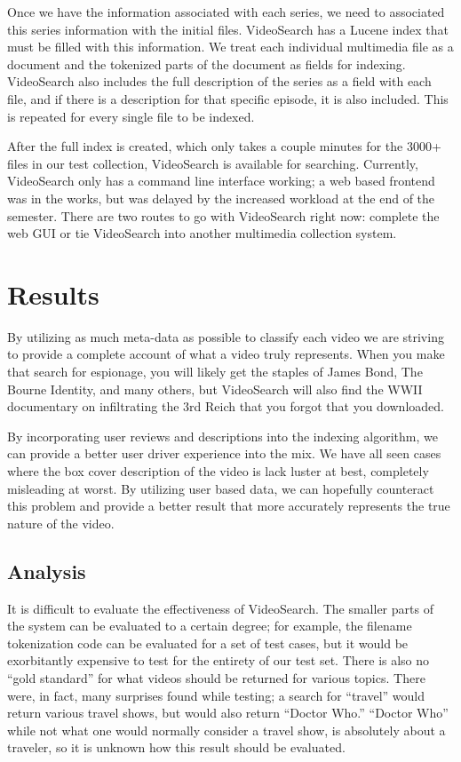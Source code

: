 \documentclass{acm_proc_article-sp}
\begin{document}
Once we have the information associated with each series, we need to associated this series information with the initial files.  VideoSearch has a Lucene index that must be filled with this information.  We treat each individual multimedia file as a document and the tokenized parts of the document as fields for indexing.  VideoSearch also includes the full description of the series as a field with each file, and if there is a description for that specific episode, it is also included.  This is repeated for every single file to be indexed.

After the full index is created, which only takes a couple minutes for the 3000+ files in our test collection, VideoSearch is available for searching.  Currently, VideoSearch only has a command line interface working; a web based frontend was in the works, but was delayed by the increased workload at the end of the semester.  There are two routes to go with VideoSearch right now: complete the web GUI or tie VideoSearch into another multimedia collection system.


\section{Results}
    By utilizing as much meta-data as possible to classify each video we are striving to provide a complete account of what a video truly represents. When you make that search for espionage, you will likely get the staples of James Bond, The Bourne Identity, and many others, but VideoSearch will also find the WWII documentary on infiltrating the 3rd Reich that you forgot that you downloaded.

    By incorporating user reviews and descriptions into the indexing algorithm, we can provide a better user driver experience into the mix. We have all seen cases where the box cover description of the video is lack luster at best, completely misleading at worst. By utilizing user based data, we can hopefully counteract this problem and provide a better result that more accurately represents the true nature of the video.

   


\subsection{Analysis}

It is difficult to evaluate the effectiveness of VideoSearch. The smaller parts of the system can be evaluated to a certain degree; for example, the filename tokenization code can be evaluated for a set of test cases, but it would be exorbitantly expensive to test for the entirety of our test set.  There is also no “gold standard” for what videos should be returned for various topics.  There were, in fact, many surprises found while testing; a search for “travel” would return various travel shows, but would also return “Doctor Who.”  “Doctor Who” while not what one would normally consider a travel show, is absolutely about a traveler, so it is unknown how this result should be evaluated.
\end{document}
